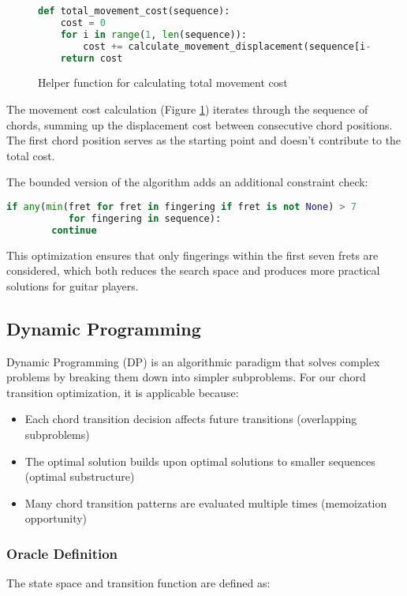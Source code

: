 \documentclass[conference]{IEEEtran}
\begin{document}
\begin{figure}[H]
\begin{lstlisting}[language=Python]
def total_movement_cost(sequence):
    cost = 0
    for i in range(1, len(sequence)):
        cost += calculate_movement_displacement(sequence[i-1], sequence[i])
    return cost 
\end{lstlisting}
\caption{Helper function for calculating total movement cost}
\label{fig:BruteForceCost}
\end{figure}

The movement cost calculation (Figure \ref{fig:BruteForceCost}) iterates through the sequence of chords, summing up the displacement cost between consecutive chord positions. The first chord position serves as the starting point and doesn't contribute to the total cost.

The bounded version of the algorithm adds an additional constraint check:
\begin{lstlisting}[language=Python]
    if any(min(fret for fret in fingering if fret is not None) > 7 
           for fingering in sequence):
        continue
\end{lstlisting}

This optimization ensures that only fingerings within the first seven frets are considered, which both reduces the search space and produces more practical solutions for guitar players.

\subsection{Dynamic Programming}
Dynamic Programming (DP) is an algorithmic paradigm that solves complex problems by breaking them down into simpler subproblems. For our chord transition optimization, it is applicable because:
\begin{itemize}
    \item Each chord transition decision affects future transitions (overlapping subproblems)
    \item The optimal solution builds upon optimal solutions to smaller sequences (optimal substructure)
    \item Many chord transition patterns are evaluated multiple times (memoization opportunity)
\end{itemize}

\subsubsection{Oracle Definition}
The state space and transition function are defined as:
\end{document}
